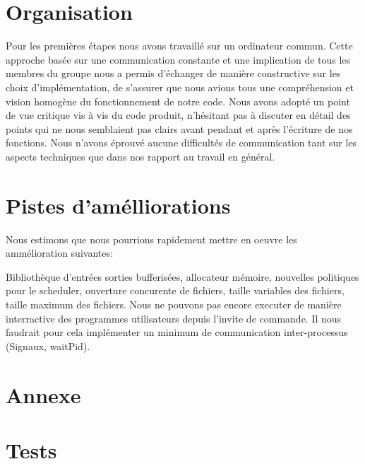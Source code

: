 \documentclass[11pt]{article}
\theoremstyle{definition}
\theoremstyle{definition}
\begin{document}
\section{Organisation}
Pour les premières étapes nous avons travaillé sur un ordinateur commun.
Cette approche basée sur une communication constante et une implication de tous les membres du groupe
nous a permis d'échanger de manière constructive sur les choix d'implémentation, de s'assurer que
nous avions tous une compréhension et vision homogène du fonctionnement de notre code. Nous
avons adopté un point de vue critique vis à vis du code produit,
n'hésitant pas à discuter en détail des points qui ne nous semblaient pas clairs
avant pendant et après l'écriture de nos fonctions. Nous n'avons éprouvé aucune difficultés de communication
tant sur les aspects techniques que dans nos rapport au travail en général.

\section{Pistes d'amélliorations}
Nous estimons que nous pourrions rapidement mettre en oeuvre les ammélioration suivantes:

Bibliothèque d'entrées sorties bufferisées, allocateur mémoire, nouvelles politiques pour le scheduler,
ouverture concurente de fichiers, taille variables des fichiers, taille maximum des fichiers.
Nous ne pouvons pas encore executer de manière interractive des programmes utilisateurs depuis l'invite de commande. Il nous faudrait pour cela implémenter un minimum de communication inter-processus (Signaux, waitPid).

\section{Annexe}

\section{Tests}
\end{document}
